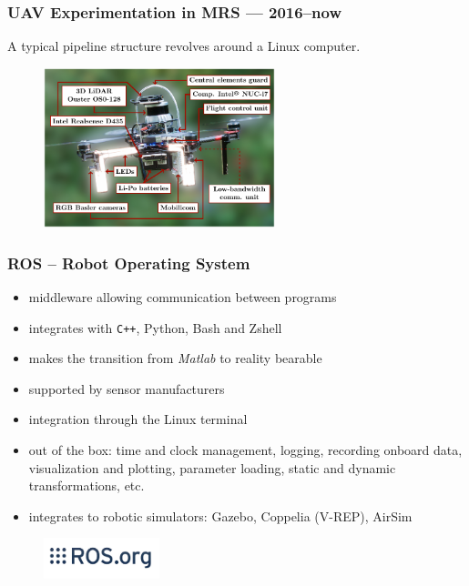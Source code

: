 \documentclass[aspectratio=169]{beamer}
\begin{document}
\begin{frame}
  \frametitle{UAV Experimentation in MRS --- 2016--now}

  \begin{block}{A typical pipeline structure revolves around a Linux computer.}
    \begin{figure}
      \includegraphics[width=0.6\textwidth]{fig/x500_labeled.pdf}
    \end{figure}
  \end{block}

\end{frame}



            \begin{frame}
              \frametitle{ROS -- Robot Operating System}

              \begin{itemize}
                \item middleware allowing communication between programs
                \item integrates with \texttt{C++}, Python, Bash and Zshell
                \item makes the transition from \emph{Matlab} to reality bearable
                \item supported by sensor manufacturers
                \item integration through the Linux terminal
                \item out of the box: time and clock management, logging, recording onboard data, visualization and plotting, parameter loading, static and dynamic transformations, etc.
                \item integrates to robotic simulators: Gazebo, Coppelia (V-REP), AirSim
              \end{itemize}

              \begin{figure}
                \includegraphics[width=0.3\textwidth]{fig/ros_logo.jpg}
              \end{figure}

            \end{frame}
\end{document}
